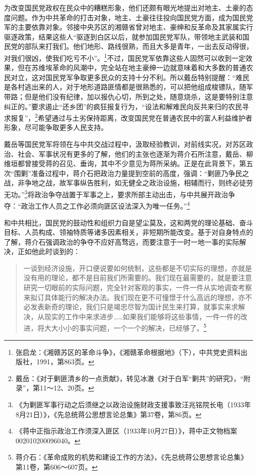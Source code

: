 为改变国民党政权在民众中的糟糕形象，他们还颇有眼光地提出对地主、土豪的态度问题。作为中共革命的打击对象，地主、土豪往往投向国民党方面，成为国民党军的主要依靠对象。邻接中央苏区的湘赣省曾对地主、豪绅和反革命及其家属实行驱逐政策，结果这些人“驱逐到白区以后，就参加国民党军队，带领地主武装和国民党的部队来打我们。他们地形、路线很熟，而且大多是青年，一出去反动得很，对我们很凶，使我们吃亏不小”。\footnote{张启龙：《湘赣苏区的革命斗争》，《湘赣革命根据地》（下），中共党史资料出版社，1991，第863页。}不过，国民党军依靠这些人固然可以收到一定效果，但在苏维埃革命的风潮中，完全站在地主豪绅一边就意味着和大多数的普通农民对立，这对国民党军争取更多民众的支持十分不利。所以戴岳特别提醒：“难民是各村逃出来的人，对于地形道路匪情都是很熟悉的，可以把他组成梭镖队，随军带路；但是他们没有纪律，加以报仇心切，所到之处，随意烧杀，这是要特别注意纠正的。”要求遏止“还乡团”的疯狂报复行为，“设法和解难民向反共来归的农民寻求报复”，\footnote{戴岳：《对于剿匪清乡的一点贡献》，转见冰澈《对于白军“剿共”的研究》，“附录”，第11～12、20页。}希望通过与土劣保持距离，改变国民党在普通农民中的富人利益维护者形象，尽可能争取更多人民支持。


戴岳等国民党军将领在与中共交战过程中，汲取经验教训，对前线实况，对苏区政治、社会、军事状况有更多的了解，他们的主张也逐渐为蒋介石所注意，戴岳、柳维垣都曾接受蒋的召见、垂询，其中不少意见为蒋所采纳。正是在此背景下，第五次“围剿”准备过程中，蒋介石把政治力量提到空前的高度，强调：“剿匪乃争民之战，非争地之战，故军事纵告胜利，如无健全之政治设施，相辅而行，则终必徒劳无功。”\footnote{《为剿匪军事行动之后须继之以政治设施财政支援事致汪兆铭院长电（1933年8月21日）》，《先总统蒋公思想言论总集》第37卷，第86页。}将政治争夺战置于军事之上，要求所部主动出击，与中共展开政治争夺：“政治工作人员之工作必须向匪区设法深入为唯一任务。”\footnote{《蒋中正指示政治工作须深入匪区（1933年10月27日）》，蒋中正文物档案002010200096040。}


和中共相比，国民党的鼓动性和组织力自是望尘莫及，这和两党的理论基础、奋斗目标、人员构成、领袖特质等诸多因素相关，非短期所能改变。基于对自身特点的了解，蒋介石强调政治的争夺不应好高骛远，而要注意于一时一地一事的实际解决，正如他此时谈到的：

\begin{quote}

一谈到经济设施，开口便说要如何统制，这些都是不切实际的理想，亦就是没有用的理论，都不是目前我们所需要的。我们现在最需要的，就是要注意研究一切眼前的实际问题，完全针对客观的事实，一件一件从实地调查考察来拟订具体能行的解决办法。我们现在更不可憧憬于什么高远的理想，亦不必发表新奇的理论，我们只是竭忠尽智为国计民生来打算，就事实来求解决，从现实的工作中来求进步……如果我们能够将这些事情，一件一件的改进，将大大小小的事实问题，一个一个的解决，已经够了。\footnote{蒋介石：《革命成败的机势和建设工作的方法》，《先总统蒋公思想言论总集》第11卷，第606～607页。}
\end{quote}


